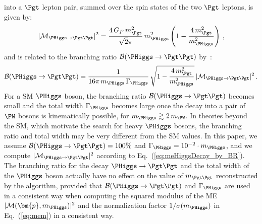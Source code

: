 into a $\Pgt$ lepton pair, summed over the spin states of the two $\Pgt$ leptons, is given by:
\begin{equation}
\vert \mathcal{M}_{\PHiggs \to \Pgt\Pgt} \vert^{2} = 
 \frac{4 \, G_{F} \, m_{\Pgt}^{2}}{\sqrt{2}\pi} \, m_{\PHiggs}^{2} \left( 1 - \frac{4 \, m_{\Pgt}^{2}}{m_{\PHiggs}^{2}} \right) \, ,
\label{eq:meHiggsDecay}
\end{equation}
and is related to the branching ratio $\mathcal{B}(\PHiggs \to \Pgt\Pgt)$
by~\cite{me_HtoTauTau}:
\begin{equation}
\mathcal{B}(\PHiggs \to \Pgt\Pgt) 
 = \frac{1}{16\pi \, m_{\PHiggs} \, \Gamma_{\PHiggs}} \, \sqrt{1 - \frac{4 \, m_{\Pgt}^{2}}{m_{\PHiggs}^{2}}} \, \vert \mathcal{M}_{\PHiggs \to \Pgt\Pgt} \vert^{2} \, .
\label{eq:meHiggsDecay_by_BR}
\end{equation}
For a SM $\PHiggs$ boson,
the branching ratio $\mathcal{B}(\PHiggs \to \Pgt\Pgt)$ becomes small and the total width $\Gamma_{\PHiggs}$ becomes large
once the decay into a pair of $\PW$ bosons is kinematically possible,
\ie for $m_{\PHiggs} \gtrsim 2 \, m_{\PW}$.
In theories beyond the SM, which motivate the search for heavy $\PHiggs$ bosons,
the branching ratio and total width may be very different from the SM
values.
In this paper, we assume $\mathcal{B}(\PHiggs \to \Pgt\Pgt) = 100\%$
and $\Gamma_{\PHiggs} = 10^{-2} \cdot m_{\PHiggs}$, 
and we compute $\vert \mathcal{M}_{\PHiggs \to \Pgt\Pgt} \vert^{2}$ according to Eq.~(\ref{eq:meHiggsDecay_by_BR}).
The branching ratio for the decay $\PHiggs \to \Pgt\Pgt$ and the total width of the $\PHiggs$ boson
actually have no effect on the value of $m_{\Pgt\Pgt}$ reconstructed by the algorithm, 
provided that $\mathcal{B}(\PHiggs \to \Pgt\Pgt)$ and $\Gamma_{\PHiggs}$ are used in
a consistent way when computing the squared modulus of the ME $\vert \mathcal{M}(\bm{p},m_{\PHiggs}) \vert^{2}$ and
the normalization factor $1/\sigma(m_{\PHiggs})$ in Eq.~(\ref{eq:mem}) in a
consistent way.

